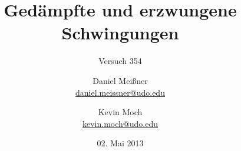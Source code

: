 


\newcommand{\name}[1]{\textsc{#1}}

\titlehead{{TU Dortmund \hfill SS~13\\}
Fakultät Physik\\
Experimentelle Übungen II}

\subject{Versuchsprotokoll}
\title{Gedämpfte und erzwungene Schwingungen}
\subtitle{Versuch 354}

\author{Daniel Meißner\\
{\normalsize\url{daniel.meissner@udo.edu}}
\and
Kevin Moch\\
{\normalsize\url{kevin.moch@udo.edu}}}

\date{02. Mai 2013}


\maketitle

\tableofcontents
\clearpage



\printbibliography
\nocite{v354}

\theappendix



